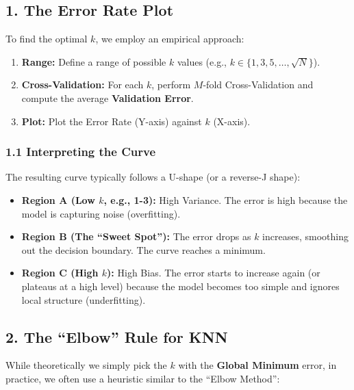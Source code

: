 \documentclass[
  italian,
  11pt,
]{article}
\begin{document}
\subsection{1. The Error Rate Plot}\label{the-error-rate-plot}

To find the optimal \(k\), we employ an empirical approach:

\begin{enumerate}
\def\labelenumi{\arabic{enumi}.}
\item
  \textbf{Range:} Define a range of possible \(k\) values (e.g.,
  \(k \in \{1, 3, 5, \dots, \sqrt{N}\}\)).
\item
  \textbf{Cross-Validation:} For each \(k\), perform \(M\)-fold
  Cross-Validation and compute the average \textbf{Validation Error}.
\item
  \textbf{Plot:} Plot the Error Rate (Y-axis) against \(k\) (X-axis).
\end{enumerate}

\subsubsection{1.1 Interpreting the Curve}\label{interpreting-the-curve}

The resulting curve typically follows a U-shape (or a reverse-J shape):

\begin{itemize}
\item
  \textbf{Region A (Low \(k\), e.g., 1-3):} High Variance. The error is
  high because the model is capturing noise (overfitting).
\item
  \textbf{Region B (The ``Sweet Spot''):} The error drops as \(k\)
  increases, smoothing out the decision boundary. The curve reaches a
  minimum.
\item
  \textbf{Region C (High \(k\)):} High Bias. The error starts to
  increase again (or plateaus at a high level) because the model becomes
  too simple and ignores local structure (underfitting).
\end{itemize}

\subsection{2. The ``Elbow'' Rule for KNN}\label{the-elbow-rule-for-knn}

While theoretically we simply pick the \(k\) with the \textbf{Global
Minimum} error, in practice, we often use a heuristic similar to the
``Elbow Method'':
\end{document}
